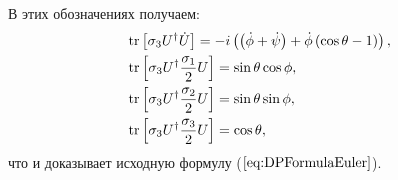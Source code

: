 В этих обозначениях получаем:
\begin{align*}
	&\mathrm{tr}\left[\sigma_3 U^\dagger \dot{U}\right] = -i \left( \left(\dot{\phi} + \dot{\psi}\right) + \dot{\phi}\left(\cos{\theta} - 1\right)\right),
	\\
	&\mathrm{tr}\left[\sigma_3U^\dagger \frac{\sigma_1}{2} U\right] = \sin{\theta}\cos{\phi},
	\\
	&\mathrm{tr}\left[\sigma_3U^\dagger \frac{\sigma_2}{2} U\right] = \sin{\theta}\sin{\phi},
	\\
	&\mathrm{tr}\left[\sigma_3U^\dagger \frac{\sigma_3}{2} U\right] = \cos{\theta},
\end{align*}
что и доказывает исходную формулу ($\ref{eq:DPFormulaEuler}$).
